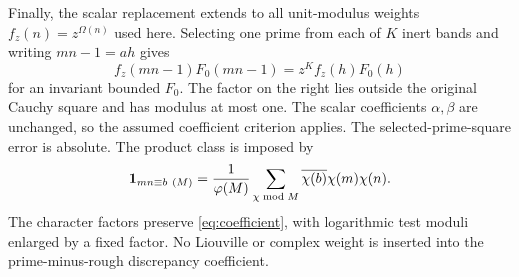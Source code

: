 Finally, the scalar replacement extends to all unit-modulus weights
$f_z(n)=z^{\Omega(n)}$ used here. Selecting one prime from each of
$K$ inert bands and writing $mn-1=ah$ gives
\begin{equation}\label{eq:detphase}
 f_z(mn-1)F_0(mn-1)=z^K f_z(h)F_0(h)
\end{equation}
for an invariant bounded $F_0$. The factor on the right lies outside
the original Cauchy square and has modulus at most one. The scalar
coefficients $\alpha,\beta$ are unchanged, so the assumed coefficient
criterion applies. The selected-prime-square error is absolute.
The product class is imposed by
\[
 \mathbf 1_{mn\equiv b\ (M)}
 =\frac1{\varphi(M)}\sum_{\chi\bmod M}
       \overline{\chi(b)}\chi(m)\chi(n).
\]
The character factors preserve \eqref{eq:coefficient}, with logarithmic
test moduli enlarged by a fixed factor. No Liouville or complex weight
is inserted into the prime-minus-rough discrepancy coefficient.
